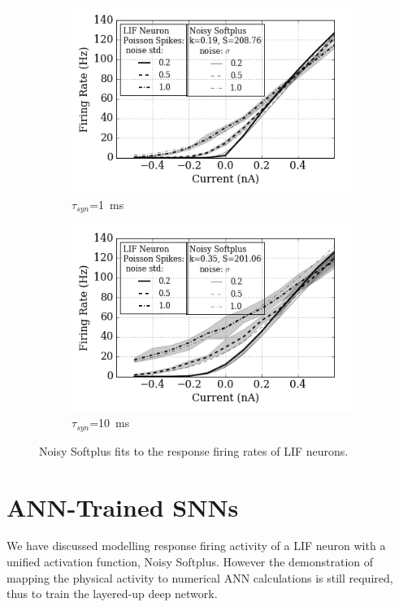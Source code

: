 	\begin{figure}
		\centering
		\begin{subfigure}[t]{0.49\textwidth}
			\includegraphics[width=\textwidth]{pics_iconip/4-1.png}
			\caption{$\tau_{syn}$=1~ms}
		\end{subfigure}
		\begin{subfigure}[t]{0.49\textwidth}
			\includegraphics[width=\textwidth]{pics_iconip/4-10.png}
			\caption{$\tau_{syn}$=10~ms}
		\end{subfigure}
		\caption{Noisy Softplus fits to the response firing rates of LIF neurons.}
		\label{Fig:nsptau1}
	\end{figure}		
	
	
\section{ANN-Trained SNNs}	
	We have discussed modelling response firing activity of a LIF neuron with a unified activation function, Noisy Softplus.
	However the demonstration of mapping the physical activity to numerical ANN calculations is still required, thus to train the layered-up deep network.
	
